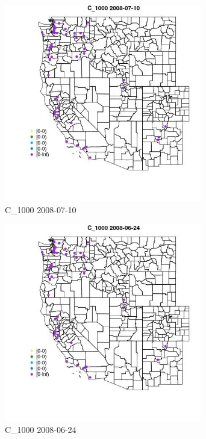 \begin{figure} 
\centering  
\includegraphics[width=0.77\textwidth]{Code_Outputs/Report_ML_input_PM25_Step4_part_e_de_duplicated_aves_MapObsC_10002008-07-10.jpg} 
\caption{\label{fig:Report_ML_input_PM25_Step4_part_e_de_duplicated_avesMapObsC_10002008-07-10}C_1000 2008-07-10} 
\end{figure} 
 

\begin{figure} 
\centering  
\includegraphics[width=0.77\textwidth]{Code_Outputs/Report_ML_input_PM25_Step4_part_e_de_duplicated_aves_MapObsC_10002008-06-24.jpg} 
\caption{\label{fig:Report_ML_input_PM25_Step4_part_e_de_duplicated_avesMapObsC_10002008-06-24}C_1000 2008-06-24} 
\end{figure} 
 

